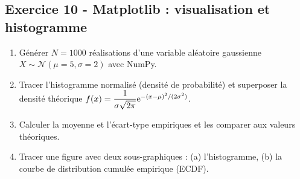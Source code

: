 \documentclass[12pt,a4paper]{article}
\begin{document}
\subsection*{Exercice 10 - Matplotlib : visualisation et histogramme \niveau{\moyen}}

\begin{boiteexercice}
\begin{enumerate}
  \item Générer $N = 1000$ réalisations d'une variable aléatoire gaussienne $X \sim \mathcal{N}(\mu=5, \sigma=2)$ avec NumPy.
  \item Tracer l'histogramme normalisé (densité de probabilité) et superposer la densité théorique $f(x) = \dfrac{1}{\sigma\sqrt{2\pi}}\mathrm{e}^{-(x-\mu)^2/(2\sigma^2)}$.
  \item Calculer la moyenne et l'écart-type empiriques et les comparer aux valeurs théoriques.
  \item Tracer une figure avec deux sous-graphiques : (a) l'histogramme, (b) la courbe de distribution cumulée empirique (ECDF).
\end{enumerate}
\end{boiteexercice}
\end{document}
